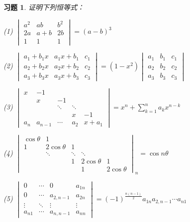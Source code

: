 \documentclass[a4paper]{book}
\newtheorem{ex}{习题}[chapter]
\newcommand{\enum}{\begin{list}{}{\setlength{\leftmargin}{0pt} \setlength{\itemindent}{2.5em} \setlength{\listparindent}{2em}}}
\begin{document}
\begin{ex} \label{ex:2.16}
证明下列恒等式：

\enum
\item[(1)] $\begin{vmatrix} a^2 & ab & b^2 \\ 2a & a + b & 2b \\ 1 & 1 & 1 \end{vmatrix} = (a - b)^3$

\item[(2)] $\begin{vmatrix} a_1 + b_1x & a_1x + b_1 & c_1 \\ a_2 + b_2x & a_2x + b_2 & c_2 \\ a_3 + b_3x & a_3x + b_3 & c_3 \end{vmatrix} = (1 - x^2)\begin{vmatrix} a_1 & b_1 & c_1 \\ a_2 & b_2 & c_2 \\ a_3 & b_3 & c_3 \end{vmatrix}$

\item[(3)] $\begin{vmatrix} x & -1 & & & \\ & x & -1 & & \\ & & \ddots & \ddots & \\ & & & x & -1 \\ a_n & a_{n-1} & \cdots & a_2 & x + a_1 \end{vmatrix} = x^n + \sum\limits_{k=1}^n a_kx^{n-k}$

\item[(4)] $\begin{vmatrix} \cos\theta & 1 & & & \\ 1 & 2\cos\theta & 1 & & \\ & \ddots & \ddots & \ddots & \\ & & 1 & 2\cos\theta & 1 \\ & & & 1 & 2\cos\theta \end{vmatrix}_n = \cos n\theta$

\item[(5)] $\begin{vmatrix} 0 & \cdots & 0 & a_{1n} \\ 0 & \cdots & a_{2,n-1} & a_{2n} \\ \vdots & \ddots & \vdots & \vdots \\ a_{n1} & \cdots & a_{n,n-1} & a_{nn} \end{vmatrix} = (-1)^{\frac{n(n-1)}{2}}a_{1n}a_{2,n-1}\cdots a_{n1}$

\end{list}
\end{ex}
\end{document}
